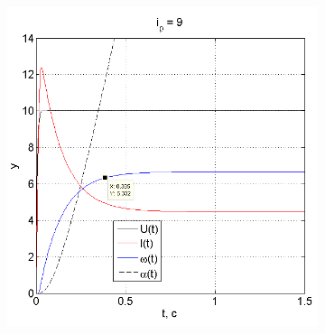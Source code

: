 \documentclass[fleqn, a4paper, 11pt, russian]{article}
\begin{document}
\begin{figure}[ht!]
\begin{subfigure}[b]{0.45\textwidth}
			\includegraphics[width = \textwidth]{M44i9}
		\end{subfigure}
	\end{figure}
\end{document}
